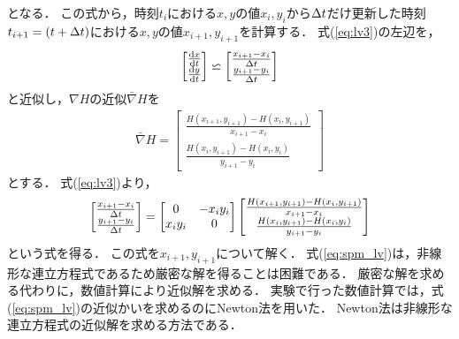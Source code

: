 となる． 
この式から，時刻$t_i$における$x,y$の値$x_i,y_i$から$\Delta t$だけ更新した時刻$t_{i+1} = (t + \Delta t)$における$x,y$の値$x_{i+1},y_{i+1}$を計算する．
式(\ref{eq:lv3})の左辺を，
\begin{align}
    \begin{bmatrix}
        \frac{\mathrm{d}x}{\mathrm{d}t} \\ 
        \frac{\mathrm{d}y}{\mathrm{d}t}
    \end{bmatrix}
     \backsimeq 
    \begin{bmatrix}
        \frac{x_{i+1} - x_i}{\Delta t} \\
         \frac{y_{i+1} - y_i}{\Delta t}
    \end{bmatrix}
\end{align}
と近似し，$\nabla H$の近似$\bar{\nabla}H$を
\begin{align}
    \bar{\nabla}H = 
    \begin{bmatrix}
        \frac{H(x_{i+1},y_{i+1}) - H(x_i,y_{i+1})}{x_{i+1} - x_i} \\
        \frac{H(x_{i},y_{i+1}) - H(x_i,y_i)}{y_{i+1} - y_i}
    \end{bmatrix}
\end{align}
とする．
式(\ref{eq:lv3})より，
\begin{align}
    \label{eq:spm_lv}
    \begin{bmatrix}
        \frac{x_{i+1} - x_i}{\Delta t} \\
         \frac{y_{i+1} - y_i}{\Delta t}
    \end{bmatrix}
    = 
    \begin{bmatrix}
        0 & -x_i y_i \\
        x_i y_i & 0
    \end{bmatrix}
    \begin{bmatrix}
        \frac{H(x_{i+1},y_{i+1}) - H(x_i,y_{i+1})}{x_{i+1} - x_i} \\
        \frac{H(x_{i},y_{i+1}) - H(x_i,y_i)}{y_{i+1} - y_i}
    \end{bmatrix}
\end{align}
という式を得る．
この式を$x_{i+1},y_{i+1}$について解く．
式(\ref{eq:spm_lv})は，非線形な連立方程式であるため厳密な解を得ることは困難である．
厳密な解を求める代わりに，数値計算により近似解を求める．
実験で行った数値計算では，式(\ref{eq:spm_lv})の近似かいを求めるのにNewton法を用いた．
Newton法は非線形な連立方程式の近似解を求める方法である．

